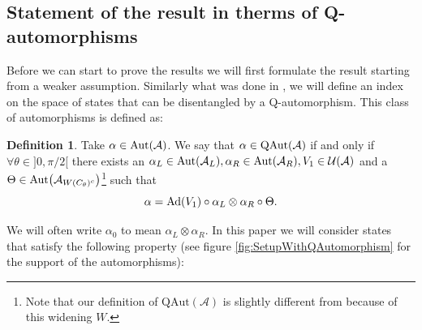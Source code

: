 \documentclass[12pt,a4paper,twoside]{article}
\let\originalleft\left
\let\originalright\right
\renewcommand{\left}{\mathopen{}\mathclose\bgroup\originalleft}
\renewcommand{\right}{\aftergroup\egroup\originalright}
\newcommand{\UU}{\mathcal U}
\renewcommand{\AA}{\mathcal A}
\newcommand{\Ad}[1]{\textrm{Ad}\left(#1\right)}
\newcommand{\Aut}[1]{\textrm{Aut}\left(#1\right)}
\newcommand{\QAut}[1]{\textrm{QAut}\left(#1\right)}
\theoremstyle{definition}
\newtheorem{definition}[theorem]{Definition}
\numberwithin{equation}{section}
\begin{document}
\subsection{Statement of the result in therms of Q-automorphisms}\label{sec:Results_2}

Before we can start to prove the results we will first formulate the result starting from a weaker assumption. Similarly what was done in \cite{ogata2021h3gmathbb}, we will define an index on the space of states that can be disentangled by a Q-automorphism. This class of automorphisms is defined as:
\begin{definition}
	Take $\alpha\in\Aut{\AA}$. We say that $\alpha\in\QAut{\AA}$ if and only if $\forall\theta\in]0,\pi/2[$ there exists an $\alpha_L\in\Aut{\AA_L},\alpha_R\in\Aut{\AA_R},V_1\in\UU(\AA)$ and a $\Theta\in\Aut{\AA_{W(C_\theta)^c}}$\footnote{Note that our definition of $\textrm{QAut}(\AA)$ is slightly different from \cite{ogata2021h3gmathbb} because of this widening $W$.} such that
	\begin{equation}
		\alpha=\Ad{V_1}\circ\alpha_L\otimes\alpha_R\circ\Theta.
	\end{equation}
\end{definition}
We will often write $\alpha_0$ to mean $\alpha_L\otimes\alpha_R$. In this paper we will consider states that satisfy the following property (see figure \ref{fig:SetupWithQAutomorphism} for the support of the automorphisms):
\end{document}
